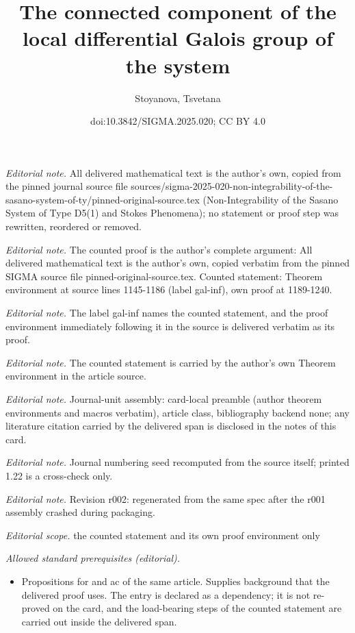 \documentclass[10pt,a4paper]{article}
\title{The connected component of the local differential Galois group of the system}
\author{Stoyanova, Tsvetana}
\date{doi:10.3842/SIGMA.2025.020; CC BY 4.0}
\numberwithin{equation}{section}
\begin{document}
\maketitle
\setcounter{section}{1}
\setcounter{Theorem}{21}
\noindent\textit{Editorial note.} All delivered mathematical text is the author's own, copied from the pinned journal source file sources/sigma-2025-020-non-integrability-of-the-sasano-system-of-ty/pinned-original-source.tex (Non-Integrability of the Sasano System of Type D5(1) and Stokes Phenomena); no statement or proof step was rewritten, reordered or removed.\par\medskip
\noindent\textit{Editorial note.} The counted proof is the author's complete argument: All delivered mathematical text is the author's own, copied verbatim from the pinned SIGMA source file pinned-original-source.tex. Counted statement: Theorem environment at source lines 1145-1186 (label gal-inf), own proof at 1189-1240.\par\medskip
\noindent\textit{Editorial note.} The label gal-inf names the counted statement, and the proof environment immediately following it in the source is delivered verbatim as its proof.\par\medskip
\noindent\textit{Editorial note.} The counted statement is carried by the author's own Theorem environment in the article source.\par\medskip
\noindent\textit{Editorial note.} Journal-unit assembly: card-local preamble (author theorem environments and macros verbatim), article class, bibliography backend none; any literature citation carried by the delivered span is disclosed in the notes of this card.\par\medskip
\noindent\textit{Editorial note.} Journal numbering seed recomputed from the source itself; printed 1.22 is a cross-check only.\par\medskip
\noindent\textit{Editorial note.} Revision r002: regenerated from the same spec after the r001 assembly crashed during packaging.\par\medskip
\noindent\textit{Editorial scope.} the counted statement and its own proof environment only\par\medskip
\noindent\textit{Allowed standard prerequisites (editorial).}\begin{itemize}
\item Propositions for and ac of the same article. Supplies background that the delivered proof uses. The entry is declared as a dependency; it is not re-proved on the card, and the load-bearing steps of the counted statement are carried out inside the delivered span.
\end{itemize}\medskip
\end{document}
